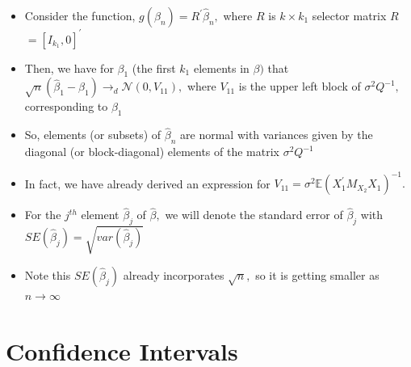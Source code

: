 \documentclass[notes=show]{beamer}
\begin{document}
\begin{frame}%


\begin{itemize}
\item Consider the function, $g\left( \widehat{\beta }_{n}\right) =R^{\prime
}\widehat{\beta }_{n},$ where $R$ is $k\times k_{1}$ selector matrix $R$ $%
=[I_{k_{1}},0]^{\prime }$

\item Then, we have for $\beta _{1}$ (the first $k_{1}$ elements in $\beta )$
that $\sqrt{n}\left( \widehat{\beta }_{1}-\beta _{1}\right) \rightarrow _{d}%
\mathcal{N}\left( 0,V_{11}\right) ,$ where $V_{11}$ is the upper left block
of $\sigma ^{2}Q^{-1},$ corresponding to $\beta _{1}$

\item So, elements (or subsets) of $\widehat{\beta }_{n}$ are normal with
variances given by the diagonal (or block-diagonal) elements of the matrix $%
\sigma ^{2}Q^{-1}$

\item In fact, we have already derived an expression for $V_{11}=\sigma ^{2}%
\mathbb{E}\left( X_{1}^{\prime }M_{X_{2}}X_{1}\right) ^{-1}.$

\item For the $j^{th}$ element $\widehat{\beta }_{j}$ of $\widehat{\beta },$
we will denote the standard error of $\widehat{\beta }_{j}$ with $SE(%
\widehat{\beta }_{j})=\sqrt{var(\widehat{\beta }_{j})}$

\item Note this $SE(\widehat{\beta }_{j})$ already incorporates $\sqrt{n},$
so it is getting smaller as $n\rightarrow \infty $
\end{itemize}

\end{frame}%

\section{Confidence Intervals}
\end{document}
